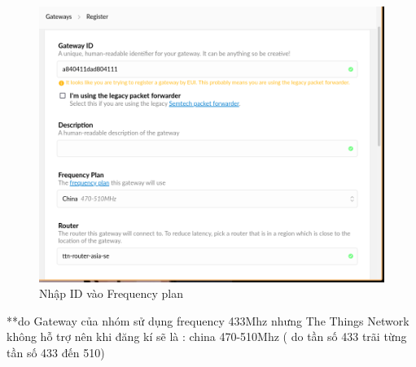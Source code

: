 \begin{description}
    \begin{figure}[H]
        \centering
        \includegraphics[width=\textwidth]{images/Quanh/Gateway_choose.png}
        \caption{Nhập ID vào Frequency plan}
        \label{fig:choose_gateway}
    \end{figure}
\end{description}
**do Gateway của nhóm sử dụng frequency 433Mhz nhưng The Things Network không hỗ trợ nên khi đăng kí sẽ là : china 470-510Mhz ( do tần số 433 trãi từng tần số 433 đến 510)

